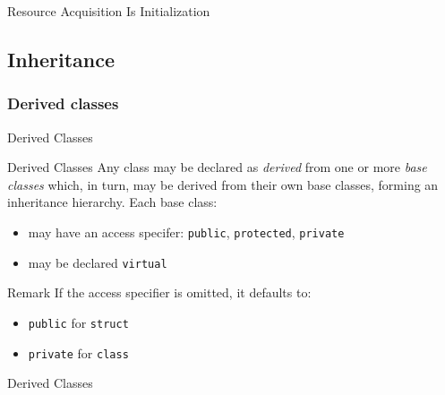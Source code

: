 \begin{frame}{Resource Acquisition Is Initialization}{}
  \begin{example}
  \end{example}
\end{frame}


\subsection{Inheritance}

\subsubsection{Derived classes}

\begin{frame}{Derived Classes}{}
  \begin{block}{Derived Classes}
    Any class may be declared as \emph{derived} from one or more \emph{base classes} which, in turn, may be derived from their own base classes, forming an inheritance hierarchy. Each base class:
    \begin{itemize}
    \item
      may have an access specifer: \lstinline!public!, \lstinline!protected!, \lstinline!private!
    \item
      may be declared \lstinline!virtual!
    \end{itemize}
  \end{block}

  \begin{block}{Remark}
    If the access specifier is omitted, it defaults to:
    \begin{itemize}
    \item
      \lstinline!public! for \lstinline!struct!
    \item
      \lstinline!private! for \lstinline!class!
    \end{itemize}
  \end{block}
\end{frame}

\begin{frame}{Derived Classes}{}
  \begin{example}
  \end{example}
\end{frame}

